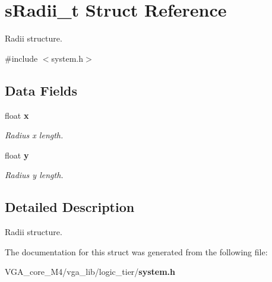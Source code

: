 \section{s\+Radii\+\_\+t Struct Reference}
\label{structs_radii__t}


Radii structure.  




{\ttfamily \#include $<$system.\+h$>$}

\subsection*{Data Fields}
\begin{DoxyCompactItemize}
\item 
float {\bf x}\label{structs_radii__t_ad0da36b2558901e21e7a30f6c227a45e}

\begin{DoxyCompactList}\small\item\em Radius x length. \end{DoxyCompactList}\item 
float {\bf y}\label{structs_radii__t_aa4f0d3eebc3c443f9be81bf48561a217}

\begin{DoxyCompactList}\small\item\em Radius y length. \end{DoxyCompactList}\end{DoxyCompactItemize}


\subsection{Detailed Description}
Radii structure. 

The documentation for this struct was generated from the following file\+:\begin{DoxyCompactItemize}
\item 
V\+G\+A\+\_\+core\+\_\+\+M4/vga\+\_\+lib/logic\+\_\+tier/{\bf system.\+h}\end{DoxyCompactItemize}
